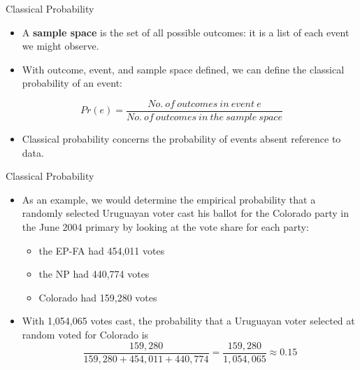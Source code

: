 \documentclass[
  ignorenonframetext,
]{beamer}
\providecommand{\tightlist}{%
  \setlength{\itemsep}{0pt}\setlength{\parskip}{0pt}}
\begin{document}
\begin{frame}{Classical Probability}
\protect\hypertarget{classical-probability-1}{}

\begin{itemize}
\item
  A \textbf{sample space} is the set of all possible outcomes: it is a
  list of each event we might observe.
\item
  With outcome, event, and sample space defined, we can define the
  classical probability of an event:
\end{itemize}

\[Pr(e) = \frac{No. \:of \:outcomes \: in\: event\: e}{No.\: of \: outcomes \: in \: the \: sample \: space}\]

\begin{itemize}
\tightlist
\item
  Classical probability concerns the probability of events absent
  reference to data.
\end{itemize}

\end{frame}

\begin{frame}{Classical Probability}
\protect\hypertarget{classical-probability-2}{}

\begin{itemize}
\item
  As an example, we would determine the empirical probability that a
  randomly selected Uruguayan voter cast his ballot for the Colorado
  party in the June 2004 primary by looking at the vote share for each
  party:

  \begin{itemize}
  \tightlist
  \item
    the EP-FA had 454,011 votes
  \item
    the NP had 440,774 votes
  \item
    Colorado had 159,280 votes
  \end{itemize}
\item
  With 1,054,065 votes cast, the probability that a Uruguayan voter
  selected at random voted for Colorado is
  \[\frac{159,280}{159,280 + 454,011 + 440,774}=\frac{159,280}{1,054,065} \approx 0.15\]
\end{itemize}

\end{frame}
\end{document}
